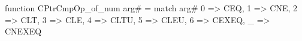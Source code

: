 function CPtrCmpOp_of_num arg# = match arg# {
  0 => CEQ,
  1 => CNE,
  2 => CLT,
  3 => CLE,
  4 => CLTU,
  5 => CLEU,
  6 => CEXEQ,
  _ => CNEXEQ
}
